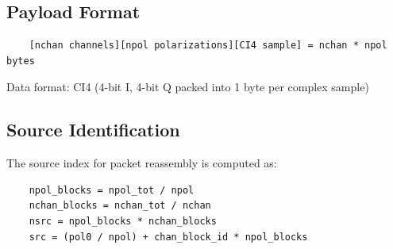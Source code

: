 \subsection{Payload Format}

\begin{verbatim}
    [nchan channels][npol polarizations][CI4 sample] = nchan * npol bytes
\end{verbatim}

Data format: CI4 (4-bit I, 4-bit Q packed into 1 byte per complex sample)

\subsection{Source Identification}

The source index for packet reassembly is computed as:
\begin{verbatim}
    npol_blocks = npol_tot / npol
    nchan_blocks = nchan_tot / nchan
    nsrc = npol_blocks * nchan_blocks
    src = (pol0 / npol) + chan_block_id * npol_blocks
\end{verbatim}
